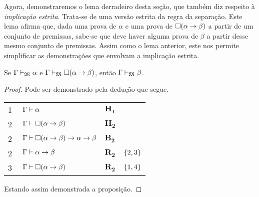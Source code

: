     \vspace{.5\baselineskip}
    Agora, demonstraremos o lema derradeiro desta seção, que também diz respeito à \emph{implicação estrita}.
    Trata-se de uma versão estrita da regra da separação.
    Este lema afirma que, dada uma prova de $\alpha$ e uma prova de $\Box(\alpha\to\beta)$ a partir de um conjunto de premissas, sabe-se que deve haver alguma prova de $\beta$ a partir desse mesmo conjunto de premissas.
    Assim como o lema anterior, este nos permite simplificar as demonstrações que envolvam a implicação estrita.

    \vspace{.5\baselineskip}
    \begin{tcolorbox}[enhanced jigsaw, breakable, sharp corners, colframe=black, colback=white, boxrule=0.5pt, left=1.5mm, right=1.5mm, top=1.5mm, bottom=1.5mm]
    \begin{lemma}\label{strict.detachment}
        Se $\Gamma\mathrel{\vdash}_{\mathfrak{M}}\alpha$ e $\Gamma\mathrel{\vdash}_{\mathfrak{M}}\Box(\alpha\to\beta)$, então $\Gamma\mathrel{\vdash}_{\mathfrak{M}}\beta$.
        \begin{proof}
            Pode ser demonstrado pela dedução que segue.

            \vspace{0.5\baselineskip}
            \footnotesize
            \setlength{\rowskip}{0.5\baselineskip}
            \begin{xltabular}{\textwidth}{r | X l l}
                \scriptsize{\phantom{0}1}\phantom{ } & $\ \Gamma\entails\alpha$                                & $\mathbf{H_1}$\phantom{1}                      & \\[\rowskip]
                \scriptsize{\phantom{0}2}\phantom{ } & $\ \Gamma\entails\nec(\alpha\to\beta)$                  & $\mathbf{H_2}$                                 & \\[\rowskip]
                \scriptsize{\phantom{0}2}\phantom{ } & $\ \Gamma\entails\nec(\alpha\to\beta)\to\alpha\to\beta$ & $\hyperref[modal.axiom.modal.2]{\mathbf{B_2}}$ & \\[\rowskip]
                \scriptsize{\phantom{0}2}\phantom{ } & $\ \Gamma\entails\alpha\to\beta$                        & $\hyperref[modal.rule.2]{\mathbf{R_2}}$        & $\left\{2,3\right\}$\\[\rowskip]
                \scriptsize{\phantom{0}3}\phantom{ } & $\ \Gamma\entails\nec(\alpha\to\beta)$                  & $\hyperref[modal.rule.2]{\mathbf{R_2}}$        & $\left\{1,4\right\}$
            \end{xltabular}
            \normalsize

            \vspace{0.5\baselineskip}
            Estando assim demonstrada a proposição.
        \end{proof}
    \end{lemma}
    \end{tcolorbox}

